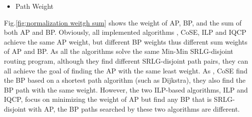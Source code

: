 \begin{itemize}
  \item Path Weight
\end{itemize}

Fig.\ref{fig:normalization weitgh sum} shows the weight of AP, BP, and the sum of both AP and BP. Obviously, all implemented algorithms \CI, CoSE, ILP and IQCP achieve the same AP weight, but different BP weights thus different sum weights of AP and BP. As all the algorithms solve the same Min-Min SRLG-disjoint routing program, although they find different SRLG-disjoint path pairs, they can all achieve the goal of finding the  AP with the same least weight.
As \CI, CoSE find the  BP based on a shortest path algorithm (such as Dijkstra), they also find the BP path with the same weight. However, the two ILP-based algorithms, ILP and IQCP, focus on minimizing the weight of AP but find any BP that is SRLG-disjoint with AP, the BP paths searched by these two algorithms are different.



